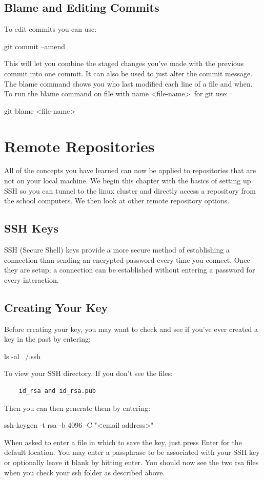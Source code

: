 \documentclass[oneside]{book}
\begin{document}
\subsection{Blame and Editing Commits}
To edit commits you can use:
    \begin{gitcode}
    git commit --amend
    \end{gitcode}
This will let you combine the staged changes you've made with the previous commit into one commit. It can also be used to just alter the commit message.
The blame command shows you who last modified each line of a file and when. To run the blame command on file with name \textless file-name\textgreater\ for git use:
    \begin{gitcode}
    git blame <file-name>
    \end{gitcode}



\section{Remote Repositories}
All of the concepts you have learned can now be applied to repositories that are not on your local machine. We begin this chapter with the basics of setting up SSH so you can tunnel to the linux cluster and directly access a repository from the school computers. We then look at other remote repository options. 
\subsection{SSH Keys}
SSH (Secure Shell) keys provide a more secure method of establishing a connection than sending an encrypted password every time you connect. Once they are setup, a connection can be established without entering a password for every interaction.
\subsection{Creating Your Key}
Before creating your key, you may want to check and see if you've ever created a key in the past by entering:
    \begin{code}
    ls -al ~/.ssh
    \end{code}
To view your SSH directory. If you don't see the files:  \begin{verbatim}
    id_rsa and id_rsa.pub
\end{verbatim}
Then you can then generate them by entering:
    \begin{code}
    ssh-keygen -t rsa -b 4096 -C "<email address>"
    \end{code}
When asked to enter a file in which to save the key, just press Enter for the default location. You may enter a passphrase to be associated with your SSH key or optionally leave it blank by hitting enter. You should now see the two rsa files when you check your ssh folder as described above. 
\end{document}
